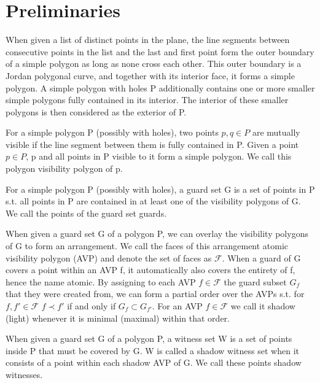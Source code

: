 \chapter{Preliminaries}
\begin{definition}
When given a list of distinct points in the plane, the line segments between consecutive points in the list and the last and first point form the outer boundary of a simple polygon as long as none cross each other. This outer boundary is a Jordan polygonal curve, and together with its interior face, it forms a simple polygon. A simple polygon with holes P additionally contains one or more smaller simple polygons fully contained in its interior. The interior of these smaller polygons is then considered as the exterior of P.
\end{definition}

\begin{definition}
For a simple polygon P (possibly with holes), two points $p,q\in P$ are mutually visible if the line segment between them is fully contained in P. Given a point $p\in P$, p and all points in P visible to it form a simple polygon. We call this polygon visibility polygon of p.
\end{definition}

\begin{definition}
For a simple polygon P (possibly with holes), a guard set G is a set of points in P s.t. all points in P are contained in at least one of the visibility polygons of G. We call the points of the guard set guards.
\end{definition}

\begin{definition}
When given a guard set G of a polygon P, we can overlay the visibility polygons of G to form an arrangement. We call the faces of this arrangement atomic visibility polygon (AVP) and denote the set of faces as $\mathcal{F}$. When a guard of G covers a point within an AVP f, it automatically also covers the entirety of f, hence the name atomic. By assigning to each AVP $f\in\mathcal{F}$ the guard subset $G_{f}$ that they were created from, we can form a partial order over the AVPs s.t. for $f,f'\in\mathcal{F}$ $f\prec f'$ if and only if $G_{f}\subset G_{f'}$. For an AVP $f\in\mathcal{F}$ we call it shadow (light) whenever it is minimal (maximal) within that order.
\end{definition}

\begin{definition}
When given a guard set G of a polygon P, a witness set W is a set of points inside P that must be covered by G. W is called a shadow witness set when it consists of a point within each shadow AVP of G. We call these points shadow witnesses.
\end{definition}


